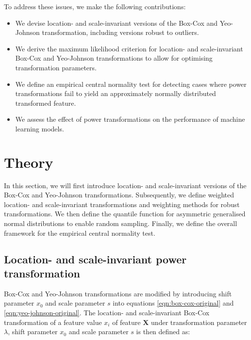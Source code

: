 \documentclass[
  a4paper,
]{article}
\begin{document}
To address these issues, we make the following contributions:

\begin{itemize}
\item
  We devise location- and scale-invariant versions of the Box-Cox and
  Yeo-Johnson transformation, including versions robust to outliers.
\item
  We derive the maximum likelihood criterion for location- and
  scale-invariant Box-Cox and Yeo-Johnson transformations to allow for
  optimising transformation parameters.
\item
  We define an empirical central normality test for detecting cases
  where power transformations fail to yield an approximately normally
  distributed transformed feature.
\item
  We assess the effect of power transformations on the performance of
  machine learning models.
\end{itemize}

\section{Theory}\label{theory}

In this section, we will first introduce location- and scale-invariant
versions of the Box-Cox and Yeo-Johnson transformations. Subsequently,
we define weighted location- and scale-invariant transformations and
weighting methods for robust transformations. We then define the
quantile function for asymmetric generalised normal distributions to
enable random sampling. Finally, we define the overall framework for the
empirical central normality test.

\subsection{Location- and scale-invariant power
transformation}\label{location--and-scale-invariant-power-transformation}

Box-Cox and Yeo-Johnson transformations are modified by introducing
shift parameter \(x_0\) and scale parameter \(s\) into equations
\ref{eqn:box-cox-original} and \ref{eqn:yeo-johnson-original}. The
location- and scale-invariant Box-Cox transformation of a feature value
\(x_i\) of feature \(\mathbf{X}\) under transformation parameter
\(\lambda\), shift parameter \(x_0\) and scale parameter \(s\) is then
defined as:
\end{document}
